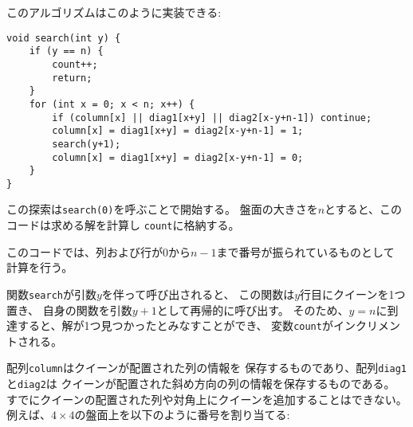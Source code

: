\begin{samepage}

\begin{comment}
The algorithm can be implemented as follows:
\end{comment}

このアルゴリズムはこのように実装できる:
\begin{lstlisting}
void search(int y) {
    if (y == n) {
        count++;
        return;
    }
    for (int x = 0; x < n; x++) {
        if (column[x] || diag1[x+y] || diag2[x-y+n-1]) continue;
        column[x] = diag1[x+y] = diag2[x-y+n-1] = 1;
        search(y+1);
        column[x] = diag1[x+y] = diag2[x-y+n-1] = 0;
    }
}
\end{lstlisting}
\end{samepage}

\begin{comment}
The search begins by calling \texttt{search(0)}.
The size of the board is $n \times n$,
and the code calculates the number of solutions
to \texttt{count}.

The code assumes that the rows and columns
of the board are numbered from 0 to $n-1$.
When the function \texttt{search} is
called with parameter $y$,
it places a queen on row $y$
and then calls itself with parameter $y+1$.
Then, if $y=n$, a solution has been found
and the variable \texttt{count} is increased by one.

The array \texttt{column} keeps track of columns
that contain a queen,
and the arrays \texttt{diag1} and \texttt{diag2}
keep track of diagonals.
It is not allowed to add another queen to a
column or diagonal that already contains a queen. 
For example, the columns and diagonals of
the $4 \times 4$ board are numbered as follows:

\end{comment}

この探索は\texttt{search(0)}を呼ぶことで開始する。
盤面の大きさを$n$とすると、このコードは求める解を計算し
\texttt{count}に格納する。

このコードでは、列および行が0から$n-1$まで番号が振られているものとして
計算を行う。

関数\texttt{search}が引数$y$を伴って呼び出されると、
この関数は$y$行目にクイーンを1つ置き、
自身の関数を引数$y+1$として再帰的に呼び出す。
そのため、$y=n$に到達すると、解が1つ見つかったとみなすことができ、
変数\texttt{count}がインクリメントされる。

配列\texttt{column}はクイーンが配置された列の情報を
保存するものであり、配列\texttt{diag1}と\texttt{diag2}は
クイーンが配置された斜め方向の列の情報を保存するものである。
すでにクイーンの配置された列や対角上にクイーンを追加することはできない。
例えば、$4 \times 4$の盤面上を以下のように番号を割り当てる:

